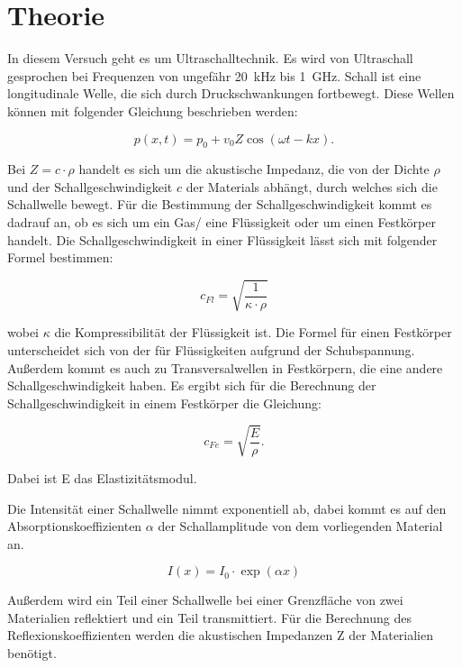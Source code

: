 \section{Theorie}

In diesem Versuch geht es um Ultraschalltechnik. Es wird von Ultraschall gesprochen
bei Frequenzen von ungefähr \SI{20}{\kilo\hertz} bis \SI{1}{\giga\hertz}. Schall ist
eine longitudinale Welle, die sich durch Druckschwankungen fortbewegt. Diese Wellen
können mit folgender Gleichung beschrieben werden:

\begin{equation*}
  p(x,t) = p_0 + v_0 Z \cos(\omega t - k x).
\end{equation*}

Bei $Z = c \cdot \rho$ handelt es sich um die akustische Impedanz, die von der
Dichte $\rho$ und der Schallgeschwindigkeit $c$ der Materials abhängt, durch welches
sich die Schallwelle bewegt. Für die Bestimmung der Schallgeschwindigkeit kommt es
dadrauf an, ob es sich um ein Gas/ eine Flüssigkeit oder um einen Festkörper handelt.
Die Schallgeschwindigkeit in einer Flüssigkeit lässt sich mit folgender Formel bestimmen:

\begin{equation}
  c_{Fl} = \sqrt{\frac{1}{\kappa \cdot \rho}}
  \label{eq:1}
\end{equation}

wobei $\kappa$ die Kompressibilität der Flüssigkeit ist. Die Formel für einen Festkörper
unterscheidet sich von der für Flüssigkeiten aufgrund der Schubspannung. Außerdem kommt es
auch zu Transversalwellen in Festkörpern, die eine andere Schallgeschwindigkeit haben.
Es ergibt sich für die Berechnung der Schallgeschwindigkeit in einem Festkörper die
Gleichung:

\begin{equation}
  c_{Fe} = \sqrt{\frac{E}{\rho}}.
  \label{eq:2}
\end{equation}

Dabei ist E das Elastizitätsmodul.

Die Intensität einer Schallwelle nimmt exponentiell ab, dabei kommt es auf den
Absorptionskoeffizienten $\alpha$ der Schallamplitude von dem vorliegenden Material an.

\begin{equation*}
  I (x) = I_0 \cdot \exp(\alpha x)
\end{equation*}

Außerdem wird ein Teil einer Schallwelle bei einer Grenzfläche von zwei Materialien
reflektiert und ein Teil transmittiert. Für die Berechnung des Reflexionskoeffizienten
werden die akustischen Impedanzen Z der Materialien benötigt.

